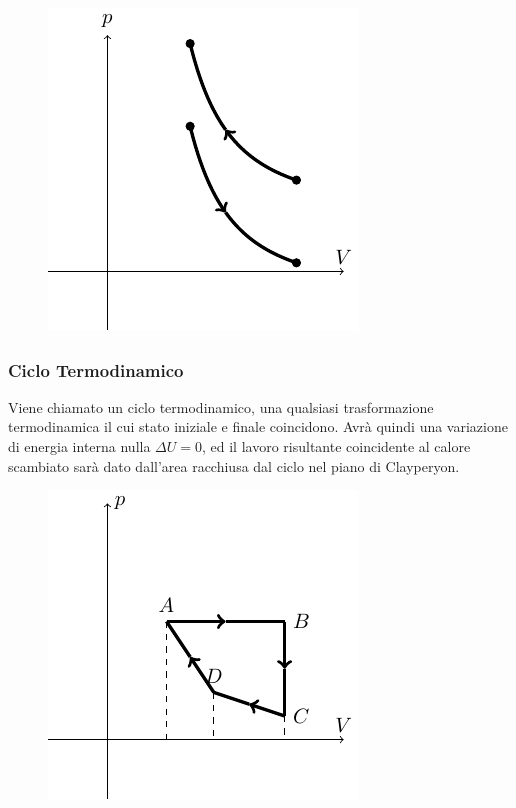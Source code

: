 \documentclass{article}
\numberwithin{equation}{subsection}
\begin{document}
\begin{figure}[H]%
    \centering
    \includegraphics{adiabatica.pdf}%
\end{figure}

\subsubsection{Ciclo Termodinamico}
Viene chiamato un ciclo termodinamico, una qualsiasi trasformazione 
termodinamica il cui stato iniziale e finale coincidono. Avrà 
quindi una variazione di energia interna nulla $\Delta U=0$, ed il 
lavoro risultante coincidente al calore scambiato sarà dato dall'area racchiusa dal ciclo 
nel piano di Clayperyon. 

\begin{figure}[H]%
    \centering
    \includegraphics{ciclo.pdf}%
\end{figure}
\end{document}
